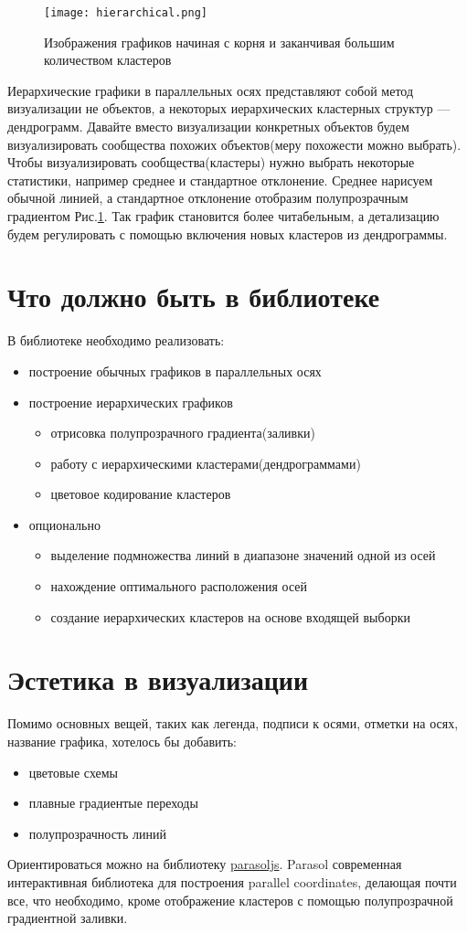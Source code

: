 \documentclass[12pt,fleqn]{article}
\begin{document}
\begin{figure}
    \centering
    \texttt{[image: hierarchical.png]}
    \caption{Изображения графиков начиная с корня и заканчивая большим количеством кластеров}
    \label{hierarchical_coords}
\end{figure}
Иерархические графики в параллельных осях представляют собой метод визуализации не объектов, а некоторых иерархических
кластерных структур --- дендрограмм. Давайте вместо визуализации конкретных объектов будем
визуализировать сообщества похожих объектов(меру похожести можно выбрать). Чтобы визуализировать сообщества(кластеры)
нужно выбрать некоторые статистики, например среднее и стандартное отклонение. Среднее нарисуем обычной линией, а 
стандартное отклонение отобразим полупрозрачным градиентом Рис.\ref{hierarchical_coords}. Так график становится 
более читабельным, а детализацию будем регулировать с помощью включения новых кластеров из дендрограммы.

\section{Что должно быть в библиотеке}
В библиотеке необходимо реализовать:
\begin{itemize}
    \item построение обычных графиков в параллельных осях
    \item построение иерархических графиков
    \begin{itemize}
        \item отрисовка полупрозрачного градиента(заливки)
        \item работу с иерархическими кластерами(дендрограммами)
        \item цветовое кодирование кластеров
    \end{itemize}
    \item опционально
    \begin{itemize}
        \item выделение подмножества линий в  диапазоне значений одной из осей
        \item нахождение оптимального расположения осей
        \item создание иерархических кластеров на основе входящей выборки
    \end{itemize}
\end{itemize}
\section{Эстетика в визуализации}
Помимо основных вещей, таких как легенда, подписи к осями, отметки на осях, название графика, хотелось бы добавить:
\begin{itemize}
    \item цветовые схемы
    \item плавные градиентые переходы 
    \item полупрозрачность линий
\end{itemize}
Ориентироваться можно на библиотеку \href{https://parasoljs.github.io/}{parasoljs}. Parasol современная интерактивная
библиотека для построения parallel coordinates, делающая почти все, что необходимо,
кроме отображение кластеров с помощью полупрозрачной градиентной заливки.
\end{document}
